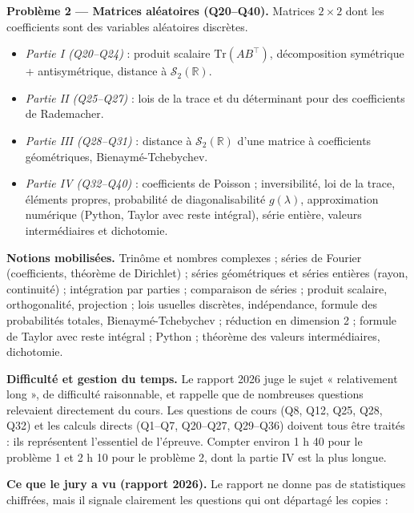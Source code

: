 \documentclass[11pt,a4paper]{article}
\providecommand{\tightlist}{\setlength{\itemsep}{0pt}\setlength{\parskip}{0pt}}
\begin{document}
\textbf{Problème 2 --- Matrices aléatoires (Q20--Q40).} Matrices \(2\times2\) dont les coefficients sont des variables aléatoires discrètes.

\begin{itemize}
\tightlist
\item
  \emph{Partie I (Q20--Q24)} : produit scalaire \(\mathrm{Tr}(AB^\top)\), décomposition symétrique + antisymétrique, distance à \(\mathcal S_2(\mathbb R)\).
\item
  \emph{Partie II (Q25--Q27)} : lois de la trace et du déterminant pour des coefficients de Rademacher.
\item
  \emph{Partie III (Q28--Q31)} : distance à \(\mathcal S_2(\mathbb R)\) d'une matrice à coefficients géométriques, Bienaymé-Tchebychev.
\item
  \emph{Partie IV (Q32--Q40)} : coefficients de Poisson ; inversibilité, loi de la trace, éléments propres, probabilité de diagonalisabilité \(g(\lambda)\), approximation numérique (Python, Taylor avec reste intégral), série entière, valeurs intermédiaires et dichotomie.
\end{itemize}

\textbf{Notions mobilisées.} Trinôme et nombres complexes ; séries de Fourier (coefficients, théorème de Dirichlet) ; séries géométriques et séries entières (rayon, continuité) ; intégration par parties ; comparaison de séries ; produit scalaire, orthogonalité, projection ; lois usuelles discrètes, indépendance, formule des probabilités totales, Bienaymé-Tchebychev ; réduction en dimension 2 ; formule de Taylor avec reste intégral ; Python ; théorème des valeurs intermédiaires, dichotomie.

\textbf{Difficulté et gestion du temps.} Le rapport 2026 juge le sujet « relativement long », de difficulté raisonnable, et rappelle que de nombreuses questions relevaient directement du cours. Les questions de cours (Q8, Q12, Q25, Q28, Q32) et les calculs directs (Q1--Q7, Q20--Q27, Q29--Q36) doivent tous être traités : ils représentent l'essentiel de l'épreuve. Compter environ 1 h 40 pour le problème 1 et 2 h 10 pour le problème 2, dont la partie IV est la plus longue.

\textbf{Ce que le jury a vu (rapport 2026).} Le rapport ne donne pas de statistiques chiffrées, mais il signale clairement les questions qui ont départagé les copies :
\end{document}
